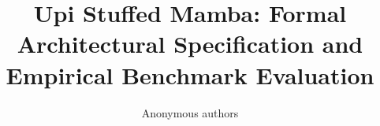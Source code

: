 \title{\textbf{Upi Stuffed Mamba: Formal Architectural Specification and Empirical Benchmark Evaluation}}

\author{Anonymous authors}
